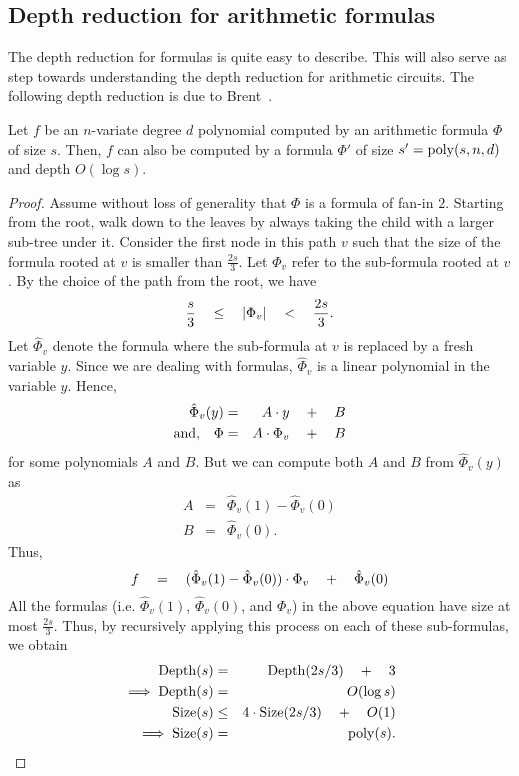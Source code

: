 \subsection{Depth reduction for arithmetic formulas}

The depth reduction for formulas is quite easy to describe. 
This will also serve as step towards understanding the depth reduction for arithmetic circuits. 
The following depth reduction is due to Brent~\cite{brent74}. 

\begin{lemma}\label{lem:formula-depth-reduction}
Let $f$ be an $n$-variate degree $d$ polynomial computed by an arithmetic formula $\Phi$ of size $s$. 
Then, $f$ can also be computed by a formula $\Phi'$ of size $s' = \operatorname{poly}(s,n,d)$ and depth $O(\log s)$. 
\end{lemma}
\begin{proof}
Assume without loss of generality that $\Phi$ is a formula of fan-in $2$. 
Starting from the root, walk down to the leaves by always taking the child with a larger sub-tree under it. 
Consider the first node in this path $v$ such that the size of the formula rooted at $v$ is smaller than $\frac{2s}{3}$. 
Let $\Phi_v$ refer to the sub-formula rooted at $v$. 
By the choice of the path from the root, we have
\[
\frac{s}{3} \quad \leq \quad \left|\Phi_v\right| \quad < \quad \frac{2s}{3}.
\]
Let $\hat{\Phi}_v$ denote the formula where the sub-formula at $v$ is replaced by a fresh variable $y$. 
Since we are dealing with formulas, $\hat{\Phi}_v$ is a linear polynomial in the variable $y$. 
Hence,
\begin{eqnarray*}
\hat{\Phi}_v(y) & = & A \cdot y \quad + \quad B\\
\text{and,}\quad \Phi & = & A \cdot \Phi_v \quad + \quad B
\end{eqnarray*}
for some polynomials $A$ and $B$. 
But we can compute both $A$ and $B$ from $\hat{\Phi}_v(y)$ as
\begin{eqnarray*}
A & = & \hat{\Phi}_v(1) - \hat{\Phi}_v(0)\\
B & = & \hat{\Phi}_v(0).
\end{eqnarray*}
Thus, 
\[
f \quad = \quad (\hat{\Phi}_v(1) - \hat{\Phi}_v(0))\cdot \Phi_v \quad + \quad \hat{\Phi}_v(0)
\]
All the formulas (i.e. $\hat{\Phi}_v(1)$, $\hat{\Phi}_v(0)$, and $\Phi_v$) in the above equation have size at most $\frac{2s}{3}$. 
Thus, by recursively applying this process on each of these sub-formulas, we obtain
\begin{eqnarray*}
\mathrm{Depth}(s) & = & \mathrm{Depth}(2s/3) \quad + \quad 3\\
\implies \mathrm{Depth}(s) &=& O(\log s)\\
\mathrm{Size}(s) & \leq & 4\cdot \mathrm{Size}(2s/3) \quad + \quad O(1)\\
\implies \mathrm{Size}(s) &=& \operatorname{poly}(s).
\end{eqnarray*}
\end{proof}

